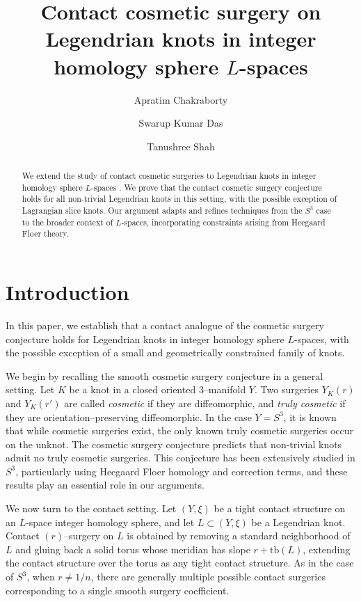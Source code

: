 \documentclass[12pt]{amsart}
\title{Contact cosmetic surgery on Legendrian knots in  integer homology sphere $L$-spaces }
\author{Apratim Chakraborty}
\author{Swarup Kumar Das}
\author{Tanushree Shah}
\theoremstyle{definition}
\theoremstyle{definition}
\newcommand{\tb}{\text{tb}}
\begin{document}
\begin{abstract}
    

We extend the study of contact cosmetic surgeries to Legendrian knots in integer homology sphere $L$-spaces . We prove that the contact cosmetic surgery conjecture holds for all non-trivial Legendrian knots in this setting, with the possible exception of Lagrangian slice knots. Our argument adapts and refines techniques from the $S^3$ case to the broader context of $L$-spaces, incorporating constraints arising from Heegaard Floer theory. 


\end{abstract}
\maketitle

\section{Introduction}



In this paper, we establish that a contact analogue of the cosmetic surgery conjecture holds for Legendrian knots in integer homology sphere $L$-spaces, with the possible exception of a small and geometrically constrained family of knots.

We begin by recalling the smooth cosmetic surgery conjecture in a general setting. Let $K$ be a knot in a closed oriented $3$–manifold $Y$. Two surgeries $Y_K(r)$ and $Y_K(r')$ are called \textit{cosmetic} if they are diffeomorphic, and \textit{truly cosmetic} if they are orientation–preserving diffeomorphic. In the case $Y=S^3$, it is known that while cosmetic surgeries exist, the only known truly cosmetic surgeries occur on the unknot. The cosmetic surgery conjecture predicts that non-trivial knots admit no truly cosmetic surgeries. This conjecture has been extensively studied in $S^3$, particularly using Heegaard Floer homology and correction terms, and these results play an essential role in our arguments.

We now turn to the contact setting. Let $(Y,\xi)$ be a tight contact structure on an $L$-space integer homology sphere, and let $L \subset (Y,\xi)$ be a Legendrian knot. Contact $(r)$–surgery on $L$ is obtained by removing a standard neighborhood of $L$ and gluing back a solid torus whose meridian has slope $r+\tb(L)$, extending the contact structure over the torus as any tight contact structure. As in the case of $S^3$, when $r \neq 1/n$, there are generally multiple possible contact surgeries corresponding to a single smooth surgery coefficient.
\end{document}
